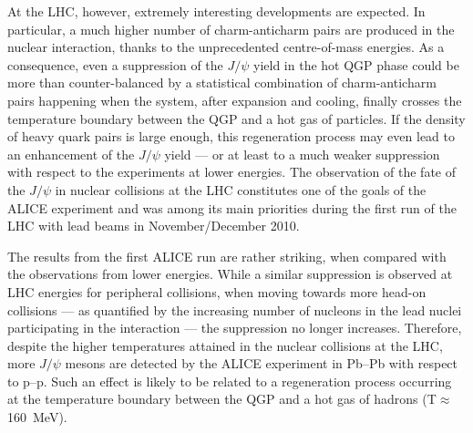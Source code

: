 At the LHC, however, extremely interesting developments are expected. In particular, a much higher number of charm-anticharm pairs are produced in the nuclear interaction, thanks to the unprecedented centre-of-mass energies. As a consequence, even a suppression of the $J/\psi$ yield in the hot QGP phase could be more than counter-balanced by a statistical combination of charm-anticharm pairs happening when the system, after expansion and cooling, finally crosses the temperature boundary between the QGP and a hot gas of particles. If the density of heavy quark pairs is large enough, this regeneration process may even lead to an enhancement of the $J/\psi$ yield --- or at least to a much weaker suppression with respect to the experiments at lower energies. The observation of the fate of the $J/\psi$ in nuclear collisions at the LHC constitutes one of the goals of the ALICE experiment and was among its main priorities during the first run of the LHC with lead beams in November/December 2010.

The results from the first ALICE run are rather striking, when compared with the observations from lower energies. While a similar suppression is observed at LHC energies for peripheral collisions, when moving towards more head-on collisions --- as quantified by the increasing number of nucleons in the lead nuclei participating in the interaction --- the suppression no longer increases. Therefore, despite the higher temperatures attained in the nuclear collisions at the LHC, more $J/\psi$ mesons are detected by the ALICE experiment in Pb--Pb with respect to p--p. Such an effect is likely to be related to a regeneration process occurring at the temperature boundary between the QGP and a hot gas of hadrons (T$\approx$160~MeV).
